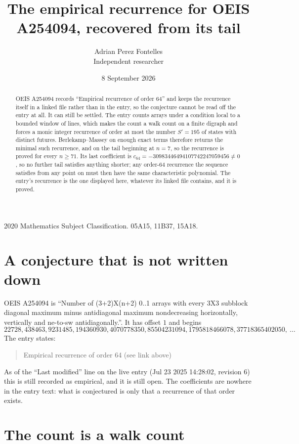 \documentclass[11pt,a4paper]{article}
\title{The empirical recurrence for OEIS A254094, recovered from its tail}
\author{Adrian Perez Fontelles\\ \small Independent researcher}
\date{8 September 2026}
\theoremstyle{plain}
\theoremstyle{definition}
\begin{document}
\maketitle

\begin{abstract}
OEIS A254094 records ``Empirical recurrence of order $64$'' and keeps the recurrence itself in
a linked file rather than in the entry, so the conjecture cannot be read off the entry at all.
It can still be settled. The entry counts arrays under a condition local to a bounded window of
lines, which makes the count a walk count on a finite digraph and forces a monic integer
recurrence of order at most the number $S'=195$ of states with distinct futures. Berlekamp--Massey on
enough exact terms therefore returns the minimal such recurrence, and on the tail beginning at $n=7$, so the recurrence is proved for every $n\ge71$.
Its last coefficient is $c_{64}=-30983446494107742247059456\neq0$, so no further tail satisfies anything
shorter; any order-$64$ recurrence the sequence satisfies from any point on must then have
the same characteristic polynomial. The entry's recurrence is the one displayed here, whatever
its linked file contains, and it is proved.
\end{abstract}

\noindent\small 2020 Mathematics Subject Classification. 05A15, 11B37, 15A18.\normalsize

\section{A conjecture that is not written down}

OEIS A254094 is ``Number of (3+2)X(n+2) 0..1 arrays with every 3X3 subblock diagonal maximum minus antidiagonal maximum nondecreasing horizontally, vertically and ne-to-sw antidiagonally.''. It has offset $1$ and begins
\[
22728, 438463, 9231485, 194360930, 4070778350, 85504231094, 1795818466078, 37718365402050,\ \dots
\]
The entry states:
\begin{quote}
Empirical recurrence of order 64 (see link above)
\end{quote}
As of the ``Last modified'' line on the live entry (Jul 23 2025 14:28:02, revision 6)
this is still recorded as empirical, and it is still open. The coefficients are nowhere in the
entry text: what is conjectured is only that a recurrence of that order exists.

\section{The count is a walk count}
\end{document}
